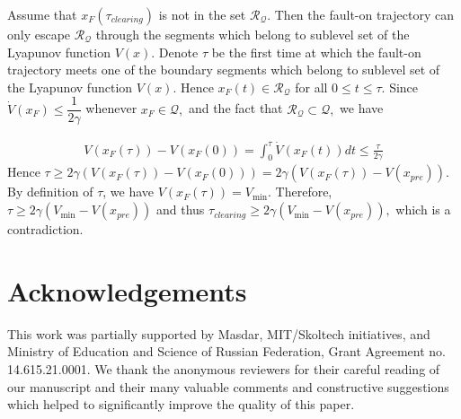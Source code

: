\documentclass[final]{IEEEtran}
\begin{document}
Assume that $x_F(\tau_{clearing})$ is not in the set
$\mathcal{R_Q}.$ Then the fault-on trajectory can only escape
$\mathcal{R_Q}$ through the segments which belong to sublevel set
of the Lyapunov function $V(x).$ Denote $\tau$ be the first time
at which the fault-on trajectory meets one of the boundary
segments which belong to sublevel set of the Lyapunov function
$V(x).$ Hence $x_F(t) \in \mathcal{R_Q}$ for all $0 \le t \le
\tau.$ Since $\dot{V}(x_F) \le \dfrac{1}{2\gamma}$ whenever $x_F
\in \mathcal{Q},$ and the fact that $\mathcal{R_Q}\subset
\mathcal{Q},$ we have

\begin{align}
V(x_F(\tau))-V(x_F(0)) = \int_0^{\tau} \dot{V}(x_F(t))dt \le
\frac{\tau}{2\gamma}
\end{align}
Hence $\tau \ge 2\gamma
(V(x_F(\tau))-V(x_F(0)))=2\gamma(V(x_F(\tau))-V(x_{pre})).$ By
definition of $\tau$, we have $V(x_F(\tau))=V_{\min}.$ Therefore,
$\tau \ge 2\gamma(V_{\min}-V(x_{pre}))$ and thus
$\tau_{clearing}\ge 2\gamma(V_{\min}-V(x_{pre})),$ which is a
contradiction.

\section{Acknowledgements}
This work was partially supported by  Masdar, MIT/Skoltech
initiatives, and Ministry of Education and Science of Russian
Federation, Grant Agreement no. 14.615.21.0001. We thank the
anonymous reviewers for their careful reading of our manuscript
and their many valuable comments and constructive suggestions
which helped to significantly improve the quality of this paper.



\end{document}
